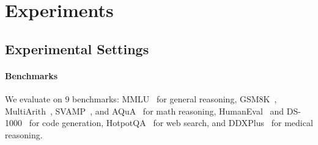 \section{Experiments}
\subsection{Experimental Settings}

\paragraph{Benchmarks} We evaluate \ourmethod on 9 benchmarks: MMLU~\citep{hendrycksmeasuring} for general reasoning, GSM8K~\citep{cobbe2021training}, MultiArith~\citep{roy2015solving}, SVAMP~\citep{patel2021nlp}, and AQuA~\citep{ling2017program} for math reasoning, HumanEval~\citep{chen2021evaluating} and DS-1000~\citep{lai2023ds} for code generation, HotpotQA~\citep{yang2018hotpotqa} for web search, and DDXPlus~\citep{fansi2022ddxplus} for medical reasoning.



